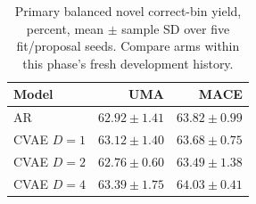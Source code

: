 \begin{table}[htbp]
\centering\small
\caption{Primary balanced novel correct-bin yield, percent, mean $\pm$ sample SD over five fit/proposal seeds. Compare arms within this phase's fresh development history.}
\begin{tabular}{lrr}\toprule
Model & UMA & MACE\\\midrule
AR & $62.92\pm1.41$ & $63.82\pm0.99$\\
CVAE $D=1$ & $63.12\pm1.40$ & $63.68\pm0.75$\\
CVAE $D=2$ & $62.76\pm0.60$ & $63.49\pm1.38$\\
CVAE $D=4$ & $63.39\pm1.75$ & $64.03\pm0.41$\\
\bottomrule\end{tabular}
\end{table}
